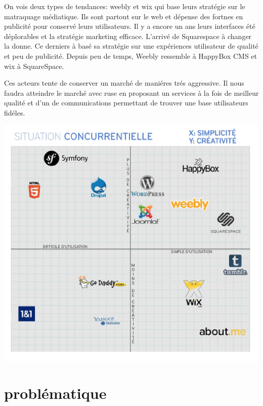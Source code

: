 \documentclass[11pt, a4paper ]{article}
\let\stdsection\section
\renewcommand\section{\newpage\stdsection}
\begin{document}
\begin{spacing}{1.5}
On vois deux types de tendances: weebly et wix qui base leurs stratégie sur le matraquage médiatique. Ils sont partout sur le web et dépense des fortnes en publicité pour conservé leurs utilisateurs. Il y a encore un ans leurs interfaces été déplorables et la stratégie marketing efficace.
L'arrivé de Squarespace à changer la donne. Ce derniers à basé sa stratégie sur une expériences utilisateur de qualité et peu de publicité. Depuis peu de temps, Weebly ressemble à HappyBox CMS et wix à SquareSpace.

Ces acteurs tente de conserver un marché de maniéres trés aggressive. Il nous faudra atteindre le marché avec ruse en proposant un services à la fois de meilleur qualité et d'un de communications permettant de trouver une base utilisateurs fidéles.

\begin{center}
	\includegraphics[width=\textwidth]{images/media/concurenceHBCMS}
\end{center}

		

		\section{problématique} %


\end{spacing}
\end{document}
